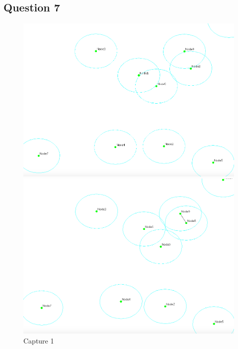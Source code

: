 \documentclass[10pt]{report}
\begin{document}
\subsection{Question 7}

\begin{figure}[h]
\begin{center}
\begin{minipage}{0.4\textwidth} \begin{flushleft}
\includegraphics[height = 0.2\textheight,width = 1\textwidth]{imgs/1.png}
 		\caption[cap1]{Capture 1}
        \label{fig:Capture 1}
\end{flushleft}\end{minipage}
\begin{minipage}{0.4\textwidth} \begin{flushright}
\includegraphics[height = 0.2\textheight,width = 1\textwidth]{imgs/2.png}

\end{flushright}
\end{minipage}
\end{center}
\end{figure}
\end{document}
